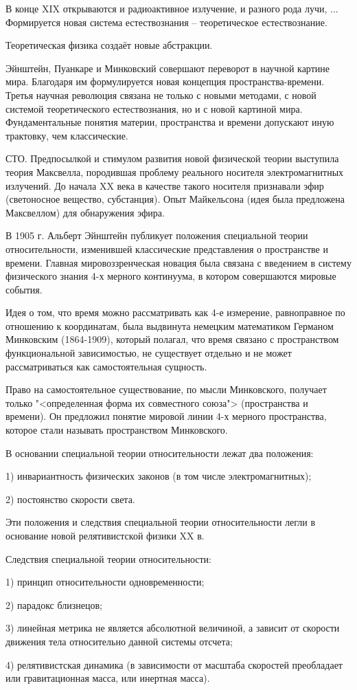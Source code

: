 \documentclass[exam_answers.tex]{subfiles}
\begin{document}
\renewcommand{\baselinestretch}{\blch}

В конце XIX открываются и радиоактивное излучение, и разного рода лучи, ...
Формируется новая система естествознания -- теоретическое естествознание.

Теоретическая физика создаёт новые абстракции.

Эйнштейн, Пуанкаре и Минковский совершают переворот в научной картине мира.
Благодаря им формулируется новая концепция пространства-времени.
Третья научная революция связана не только с новыми методами, с новой системой теоретического естествознания, но и с новой картиной мира.
Фундаментальные понятия материи, пространства и времени допускают иную трактовку, чем классические.

СТО.
Предпосылкой и стимулом развития новой физической теории выступила теория Максвелла, породившая проблему реального носителя электромагнитных излучений.
До начала XX века в качестве такого носителя
признавали эфир (светоносное вещество, субстанция).
Опыт Майкельсона (идея была предложена Максвеллом) для обнаружения эфира.

В 1905 г. Альберт Эйнштейн публикует положения специальной теории
относительности, изменившей классические представления о пространстве и времени.
Главная мировоззренческая новация была связана с введением в
систему физического знания 4-х мерного континуума, в котором совершаются мировые события.


Идея о том, что время можно рассматривать как 4-е измерение, равноправное по
отношению к координатам, была выдвинута немецким математиком Германом
Минковским (1864-1909), который полагал, что время связано с пространством
функциональной зависимостью, не существует отдельно и не может рассматриваться
как самостоятельная сущность.

Право на самостоятельное существование, по мысли Минковского, получает только
"<определенная форма их совместного союза"> (пространства и времени).
Он предложил понятие мировой линии 4-х мерного пространства, которое стали называть
пространством Минковского.

В основании специальной теории относительности лежат два положения:

1) инвариантность физических законов (в том числе электромагнитных);

2) постоянство скорости света.

Эти положения и следствия специальной теории относительности легли в
основание новой релятивистской физики XX в.

Следствия специальной теории относительности:

1) принцип относительности одновременности;

2) парадокс близнецов;

3) линейная метрика не является абсолютной величиной, а зависит от скорости движения тела относительно данной системы отсчета;

4) релятивистская динамика (в зависимости от масштаба скоростей преобладает или гравитационная масса, или инертная масса).
\end{document}
